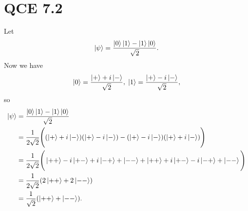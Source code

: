 \documentclass[10pt]{article}
\begin{document}
\section*{QCE 7.2}
Let 
\[
\ket{\psi} = \frac{\ket{0}\ket{1} - \ket{1}\ket{0}}{\sqrt{2}}.
\]
Now we have
\[ 
\ket{0} = \frac{\ket{+} + i\ket{-}}{\sqrt{2}}, \; \ket{1} = \frac{\ket{+} - i\ket{-}}{\sqrt{2}},
\]
so 
\begin{align*}
\ket{\psi} &= \frac{\ket{0}\ket{1} - \ket{1}\ket{0}}{\sqrt{2}} \\
                &= \frac{1}{2\sqrt{2}} \Bigg( (\ket{+} + i\ket{-}) ( \ket{+} - i\ket{-} ) - (\ket{+} - i\ket{-}) ( \ket{+} + i\ket{-} ) \Bigg) \\
                &= \frac{1}{2\sqrt{2}} \Bigg( \ket{++} - i\ket{+-} + i \ket{-+} +\ket{--} + \ket{++} + i\ket{+-} -i \ket{-+} + \ket{--}\Bigg) \\
                &= \frac{1}{2\sqrt{2}} ( 2\ket{++}  + 2\ket{--}) \\
                &= \frac{1}{\sqrt{2}} (\ket{++} + \ket{--}).
\end{align*}
\end{document}
